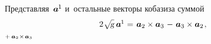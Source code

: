 \begin{otherlanguage}{russian}
Представляя~${\bm{a}^{\hspace{-0.1ex}1}\hspace{-0.1ex}}$ и~остальные векторы кобазиза суммой
\vspace{1.1em}\[\begin{array}{l@{\hspace{0.3em}}c@{\hspace{0.36em}}r}
2 \hspace{0.1ex} \scalebox{0.95}[0.96]{$\sqrt{\hspace{-0.36ex}\mathstrut{\textsl{g}}}$} \hspace{0.5ex} \bm{a}^{\hspace{-0.1ex}1} & = & \bm{a}_2 \times \bm{a}_3 \hspace{0.2ex} \tikzmark{BeginPlusToMinus} - \hspace{0.2ex} \bm{a}_3 \times \bm{a}_2 \tikzmark{EndPlusToMinus} \hspace{0.2ex},
\end{array}\]%
%
{${\scriptstyle {+ \hspace{0.4ex} \bm{a}_2 \hspace{0.1ex} \times \hspace{0.2ex} \bm{a}_3}}$}


\end{otherlanguage}
